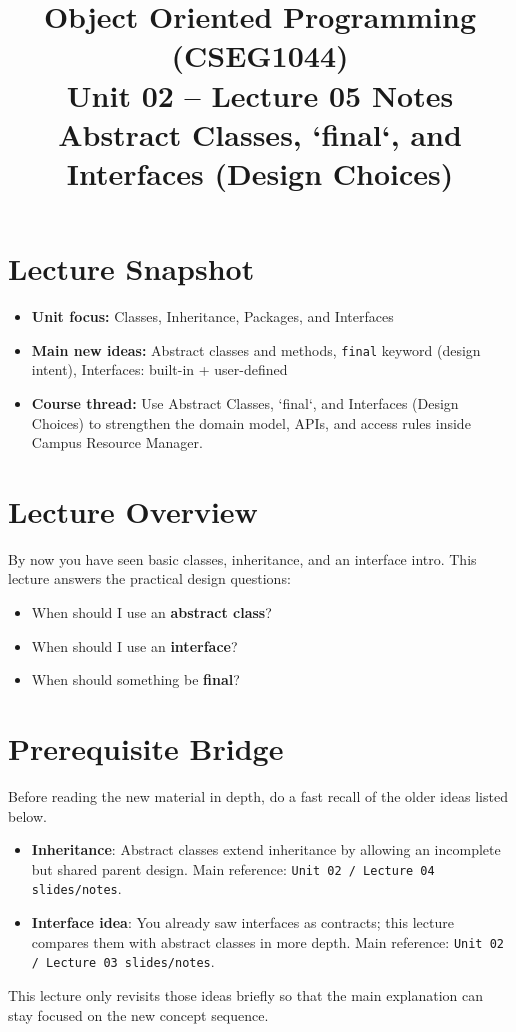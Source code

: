 \documentclass[11pt]{article}
\title{Object Oriented Programming (CSEG1044)\\Unit 02 -- Lecture 05 Notes\\Abstract Classes, `final`, and Interfaces (Design Choices)}
\begin{document}
\maketitle
\tableofcontents

\section{Lecture Snapshot}
\begin{itemize}
  \item \textbf{Unit focus:} Classes, Inheritance, Packages, and Interfaces
  \item \textbf{Main new ideas:} Abstract classes and methods, \texttt{final} keyword (design intent), Interfaces: built-in + user-defined
  \item \textbf{Course thread:} Use Abstract Classes, `final`, and Interfaces (Design Choices) to strengthen the domain model, APIs, and access rules inside Campus Resource Manager.
\end{itemize}
\notesources{\OOPSUnitIISources}

\section{Lecture Overview}
By now you have seen basic classes, inheritance, and an interface intro.
This lecture answers the practical design questions:
\begin{itemize}
  \item When should I use an \textbf{abstract class}?
  \item When should I use an \textbf{interface}?
  \item When should something be \textbf{final}?
\end{itemize}
\notesources{\OOPSUnitIISources}

\section{Prerequisite Bridge}
Before reading the new material in depth, do a fast recall of the older ideas listed below.
\begin{itemize}
  \item \textbf{Inheritance}: Abstract classes extend inheritance by allowing an incomplete but shared parent design. Main reference: \texttt{Unit 02 / Lecture 04 slides/notes}.
  \item \textbf{Interface idea}: You already saw interfaces as contracts; this lecture compares them with abstract classes in more depth. Main reference: \texttt{Unit 02 / Lecture 03 slides/notes}.
\end{itemize}
This lecture only revisits those ideas briefly so that the main explanation can stay focused on the new concept sequence.
\notesources{\OOPSUnitIISources}
\end{document}
